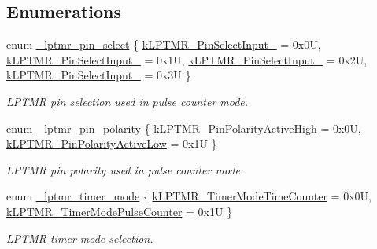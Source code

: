 \subsection*{Enumerations}
\begin{DoxyCompactItemize}
\item 
enum \mbox{\hyperlink{group__lptmr_gad7812eb27238f5bd2cb3edc40d5f25ed}{\+\_\+lptmr\+\_\+pin\+\_\+select}} \{ \mbox{\hyperlink{group__lptmr_ggad7812eb27238f5bd2cb3edc40d5f25edaa5591ed16b209e49a55d782b0152d27b}{k\+L\+P\+T\+M\+R\+\_\+\+Pin\+Select\+Input\+\_}} = 0x0U, 
\mbox{\hyperlink{group__lptmr_ggad7812eb27238f5bd2cb3edc40d5f25edaf380fdd8c93021e9b0cc2520b9942faf}{k\+L\+P\+T\+M\+R\+\_\+\+Pin\+Select\+Input\+\_}} = 0x1U, 
\mbox{\hyperlink{group__lptmr_ggad7812eb27238f5bd2cb3edc40d5f25eda804a4b70aa7e0a2996cb054e1feddf4e}{k\+L\+P\+T\+M\+R\+\_\+\+Pin\+Select\+Input\+\_}} = 0x2U, 
\mbox{\hyperlink{group__lptmr_ggad7812eb27238f5bd2cb3edc40d5f25eda35b44045498f8af998d6ca99563009be}{k\+L\+P\+T\+M\+R\+\_\+\+Pin\+Select\+Input\+\_}} = 0x3U
 \}
\begin{DoxyCompactList}\small\item\em L\+P\+T\+MR pin selection used in pulse counter mode. \end{DoxyCompactList}\item 
enum \mbox{\hyperlink{group__lptmr_ga9bd2404c984ac5eea420a396e7cdda77}{\+\_\+lptmr\+\_\+pin\+\_\+polarity}} \{ \mbox{\hyperlink{group__lptmr_gga9bd2404c984ac5eea420a396e7cdda77a2f387787b10172f719dbc304573fc0c6}{k\+L\+P\+T\+M\+R\+\_\+\+Pin\+Polarity\+Active\+High}} = 0x0U, 
\mbox{\hyperlink{group__lptmr_gga9bd2404c984ac5eea420a396e7cdda77aa083f88b878d9781b91cdf5a7cbc5fe1}{k\+L\+P\+T\+M\+R\+\_\+\+Pin\+Polarity\+Active\+Low}} = 0x1U
 \}
\begin{DoxyCompactList}\small\item\em L\+P\+T\+MR pin polarity used in pulse counter mode. \end{DoxyCompactList}\item 
enum \mbox{\hyperlink{group__lptmr_ga40237256921d8a780c71b2f4ce162498}{\+\_\+lptmr\+\_\+timer\+\_\+mode}} \{ \mbox{\hyperlink{group__lptmr_gga40237256921d8a780c71b2f4ce162498a308f1e902c37f04845e88dbdcf090d1d}{k\+L\+P\+T\+M\+R\+\_\+\+Timer\+Mode\+Time\+Counter}} = 0x0U, 
\mbox{\hyperlink{group__lptmr_gga40237256921d8a780c71b2f4ce162498a3e671df6c6027b048c5878d45031415d}{k\+L\+P\+T\+M\+R\+\_\+\+Timer\+Mode\+Pulse\+Counter}} = 0x1U
 \}
\begin{DoxyCompactList}\small\item\em L\+P\+T\+MR timer mode selection. \end{DoxyCompactList}\item 

\end{DoxyCompactItemize}
